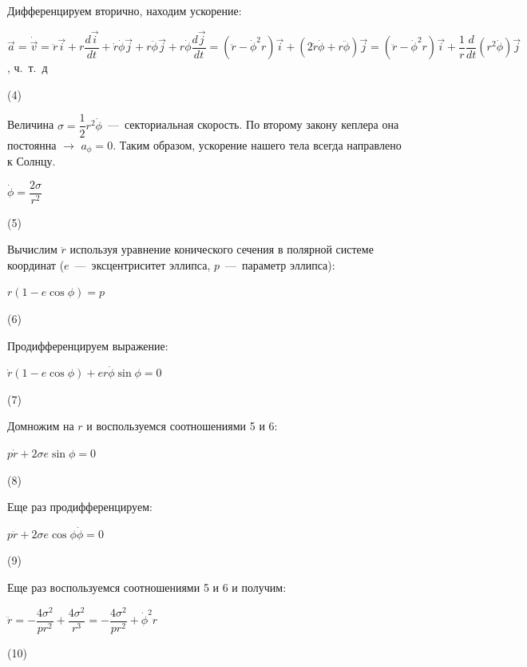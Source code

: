 \documentclass[12pt,a4paper,fleqn]{article}
\begin{document}
Дифференцируем вторично, находим ускорение:
\begin{center}
$\vec{a} = \dot{\vec{v}} = \ddot{r} \vec{i} + r \dfrac{d \vec{i}}{dt} + \dot{r} \dot{\phi} \vec{j} + r \ddot{\phi} \vec{j} + r \dot{\phi} \dfrac{d \vec{j}}{dt} = (\ddot{r} - \dot{\phi}^2r) \vec{i} + (2 \dot{r} \dot{\phi} + r \ddot{\phi}) \vec{j} = (\ddot{r} - \dot{\phi}^2r) \vec{i} + \dfrac{1}{r}\dfrac{d}{dt} \left( r^2 \dot{\phi} \right) \vec{j}$, ч.~т.~д
\begin{flushright}
(4)
\end{flushright}
\end{center}
Величина $\sigma =  \dfrac{1}{2}r^2 \dot{\phi}$~---~секториальная скорость. По второму закону кеплера она постоянна $\rightarrow$ $a_{\phi} = 0$. Таким образом, ускорение нашего тела всегда направлено к Солнцу. 
\begin{center}
$\dot{\phi} = \dfrac{2 \sigma}{r^2}$
\begin{flushright}
(5)
\end{flushright}
\end{center} 
Вычислим $\ddot{r}$ используя уравнение конического сечения в полярной системе координат ($e$~---~эксцентриситет эллипса, $p$~---~параметр эллипса):
\begin{center}
$r(1 - e \cos \phi) = p$
\begin{flushright}
(6)
\end{flushright}
\end{center}
Продифференцируем выражение:
\begin{center}
$\dot{r}(1 - e \cos \phi) + e r \dot{\phi} \sin \phi = 0$
\begin{flushright}
(7)
\end{flushright}
\end{center}
Домножим на $r$ и воспользуемся соотношениями 5 и 6:
\begin{center}
$p \dot{r} + 2 \sigma e \sin \phi = 0$
\begin{flushright}
(8)
\end{flushright}
\end{center}
Еще раз продифференцируем:
\begin{center}
$p \ddot{r} + 2 \sigma e \cos \phi \dot{\phi} = 0$
\begin{flushright}
(9)
\end{flushright}
\end{center}
Еще раз воспользуемся соотношениями 5 и 6 и получим:
\begin{center}
$\ddot{r} = -\dfrac{4 \sigma^2}{pr^2} + \dfrac{4 \sigma^2}{r^3} = -\dfrac{4 \sigma^2}{pr^2} + \dot{\phi}^2r$
\begin{flushright}
(10)
\end{flushright}
\end{center}
\end{document}
